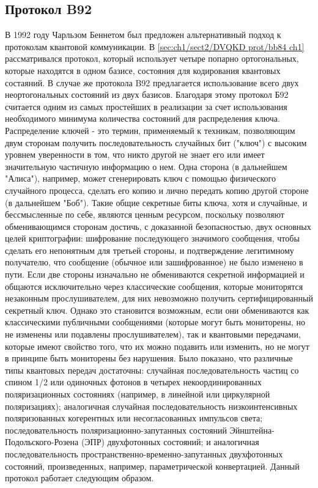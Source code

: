 \subsection{Протокол B92}\label{sec:ch1/sect2/DVQKD prot/b92 ch1}
В 1992 году Чарльзом Беннетом был предложен альтернативный подход к протоколам квантовой коммуникации. В \ref{sec:ch1/sect2/DVQKD prot/bb84 ch1} рассматривался протокол, который использует четыре попарно ортогональных, которые находятся в одном базисе, состояния  для кодирования квантовых состаяний. В случае же протокола B92 предлагается использование всего двух неортогональных состояний из двух базисов. Благодаря этому протокол Б92 считается одним из самых простейших в реализации за счет использования необходимого  минимума количества состояний для распределения ключа.
\newline Распределение ключей - это термин, применяемый к техникам, позволяющим двум сторонам получить последовательность случайных бит ("ключ") с высоким уровнем уверенности в том, что никто другой не знает его или имеет значительную частичную информацию о нем. Одна сторона (в дальнейшем "Алиса"), например, может сгенерировать ключ с помощью физического случайного процесса, сделать его копию и лично передать копию другой стороне (в дальнейшем "Боб"). Такие общие секретные биты ключа, хотя и случайные, и бессмысленные по себе, являются ценным ресурсом, поскольку позволяют обменивающимся сторонам достичь, с доказанной безопасностью, двух основных целей криптографии: шифрование последующего значимого сообщения, чтобы сделать его непонятным для третьей стороны, и подтверждение легитимному получателю, что сообщение (обычное или зашифрованное) не было изменено в пути.
\newline Если две стороны изначально не обмениваются секретной информацией и общаются исключительно через классические сообщения, которые мониторятся незаконным прослушивателем, для них невозможно получить сертифицированный секретный ключ. Однако это становится возможным, если они обмениваются как классическими публичными сообщениями (которые могут быть мониторены, но не изменены или подавлены прослушивателем), так и квантовыми передачами, которые имеют свойство того, что их можно подавить или изменить, но не могут в принципе быть мониторены без нарушения. Было показано, что различные типы квантовых передач достаточны: случайная последовательность частиц со спином 1/2 или одиночных фотонов в четырех некоординированных поляризационных состояниях (например, в линейной или циркулярной поляризациях); аналогичная случайная последовательность низкоинтенсивных поляризованных когерентных или несогласованных импульсов света; последовательность поляризационно-запутанных состояний Эйнштейна-Подольского-Розена (ЭПР) двухфотонных состояний; и аналогичная последовательность пространственно-временно-запутанных двухфотонных состояний, произведенных, например, параметрической конвертацией. Данный протокол работает следующим образом. 
